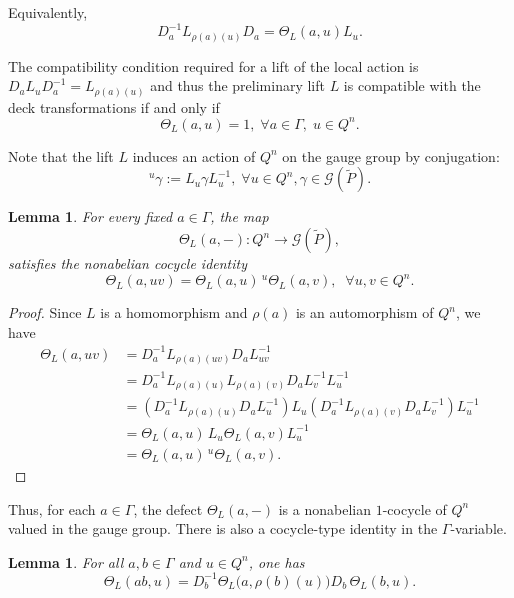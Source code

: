 \documentclass[11pt,a4paper]{article}
\numberwithin{equation}{section}
\newtheorem{lemma}[definition]{Lemma}
\theoremstyle{named}
\begin{document}
Equivalently,
\begin{equation}
\label{eq:defect-rearranged}
D_a^{-1}L_{\rho(a)(u)}D_a
=
\Theta_L(a,u)L_u.
\end{equation}

The compatibility condition required for a lift of the local action is $D_aL_uD_a^{-1}
=
L_{\rho(a)(u)}$ and thus the preliminary lift \(L\) is compatible with the deck transformations if and only if
\[
\Theta_L(a,u)=1,\;\forall a\in\Gamma,\;u\in Q^n.
\]

Note that the lift \(L\) induces an action of \(Q^n\) on the gauge group by conjugation:
\[
{}^u\gamma
:=
L_u\gamma L_u^{-1},\;\forall u\in Q^n,\gamma\in\mathcal G(\widetilde P).
\]

\begin{lemma}
\label{lem:defect-Q-cocycle}
For every fixed \(a\in\Gamma\), the map
\[
\Theta_L(a,-):
Q^n\longrightarrow\mathcal G(\widetilde P),
\]
satisfies the nonabelian cocycle identity
\begin{equation}
\label{eq:defect-Q-cocycle}
\Theta_L(a,uv)
=
\Theta_L(a,u)\,
{}^u\Theta_L(a,v),\;\;\forall u,v\in Q^n.
\end{equation}
\end{lemma}

\begin{proof}
Since \(L\) is a homomorphism and \(\rho(a)\) is an automorphism of \(Q^n\), we have
\begin{align*}
\Theta_L(a,uv)
&=
D_a^{-1}
L_{\rho(a)(uv)}
D_a
L_{uv}^{-1}
\\
&=
D_a^{-1}
L_{\rho(a)(u)}
L_{\rho(a)(v)}
D_a
L_v^{-1}L_u^{-1}
\\
&=
\left(
D_a^{-1}L_{\rho(a)(u)}D_aL_u^{-1}
\right)
L_u
\left(
D_a^{-1}L_{\rho(a)(v)}D_aL_v^{-1}
\right)
L_u^{-1}
\\
&=
\Theta_L(a,u)\,
L_u\Theta_L(a,v)L_u^{-1}
\\
&=
\Theta_L(a,u)\,
{}^u\Theta_L(a,v).
\end{align*}
\end{proof}

\noindent Thus, for each \(a\in\Gamma\), the defect \(\Theta_L(a,-)\) is a nonabelian \(1\)-cocycle of \(Q^n\) valued in the gauge group. There is also a cocycle-type identity in the \(\Gamma\)-variable.

\begin{lemma}
\label{lem:defect-Gamma-cocycle}
For all \(a,b\in\Gamma\) and \(u\in Q^n\), one has
\begin{equation}
\label{eq:defect-Gamma-cocycle}
\Theta_L(ab,u)
=
D_b^{-1}
\Theta_L\bigl(a,\rho(b)(u)\bigr)
D_b\,
\Theta_L(b,u).
\end{equation}
\end{lemma}
\end{document}
